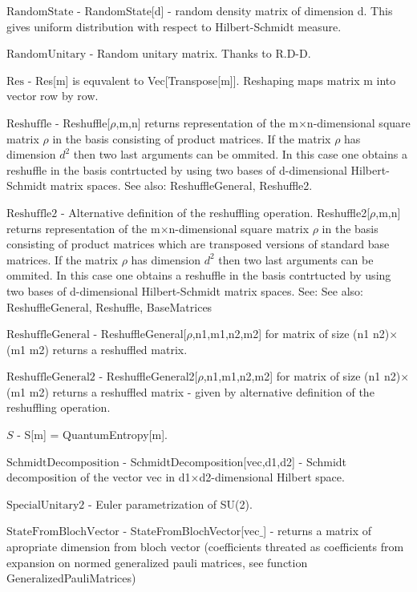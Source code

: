 \documentclass[a4paper,12pt]{article}
\begin{document}
\textbf{$ \text{RandomState} $ } - RandomState[d] - random density matrix of dimension d. This gives uniform distribution with respect to Hilbert-Schmidt measure.$  $

\textbf{$ \text{RandomUnitary} $ } - Random unitary matrix. Thanks to R.D-D.$  $

\textbf{$ \text{Res} $ } - Res[m] is equvalent to Vec[Transpose[m]]. Reshaping maps matrix m into vector row by row.$  $

\textbf{$ \text{Reshuffle} $ } - Reshuffle[$\rho $,m,n] returns representation of the m$\times $n-dimensional square matrix $\rho $ in the basis consisting of product matrices. If  the matrix $\rho $ has dimension $ d^2 $ then two last arguments can be ommited. In this case one obtains a reshuffle in the basis contrtucted by using two bases of d-dimensional Hilbert-Schmidt matrix spaces. See also: ReshuffleGeneral, Reshuffle2.$  $

\textbf{$ \text{Reshuffle2} $ } - Alternative definition of the reshuffling operation. Reshuffle2[$\rho $,m,n] returns representation of the m$\times $n-dimensional square matrix $\rho $ in the basis consisting of product matrices which are transposed versions of standard base matrices. If the matrix $\rho $ has dimension $ d^2 $ then two last arguments can be ommited. In this case one obtains a reshuffle in the basis contrtucted by using two bases of d-dimensional Hilbert-Schmidt matrix spaces. See: See also: ReshuffleGeneral, Reshuffle, BaseMatrices$  $

\textbf{$ \text{ReshuffleGeneral} $ } - ReshuffleGeneral[$\rho $,n1,m1,n2,m2] for matrix of size (n1 n2)$\times $(m1 m2) returns a reshuffled matrix.$  $

\textbf{$ \text{ReshuffleGeneral2} $ } - ReshuffleGeneral2[$\rho $,n1,m1,n2,m2] for matrix of size (n1 n2)$\times $(m1 m2) returns a reshuffled matrix - given by alternative definition of the reshuffling operation.$  $

\textbf{$ S $ } - S[m] = QuantumEntropy[m].$  $

\textbf{$ \text{SchmidtDecomposition} $ } - SchmidtDecomposition[vec,d1,d2] - Schmidt decomposition of the vector vec in d1$\times $d2-dimensional Hilbert space.$  $

\textbf{$ \text{SpecialUnitary2} $ } - Euler parametrization of SU(2).$  $

\textbf{$ \text{StateFromBlochVector} $ } - StateFromBlochVector[vec$\_$] - returns a matrix of apropriate dimension from bloch vector (coefficients threated as coefficients from expansion on normed generalized pauli matrices, see function GeneralizedPauliMatrices)$  $
\end{document}
